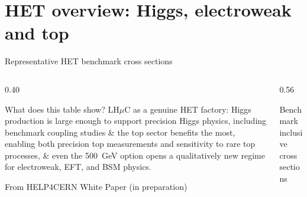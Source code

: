 \documentclass[aspectratio=1610,english]{beamer}
\begin{document}
\section{HET overview: Higgs, electroweak and top}



\begin{frame}{Representative HET benchmark cross sections}
\begin{columns}%
		
\begin{column}{0.40\textwidth}	
\begin{block}{What does this table show?}
\small
\justifying LH$\mu$C as a genuine HET factory:
Higgs production is large enough to support precision Higgs physics, including benchmark coupling studies {\color{red}\&} 
the top sector benefits the most, enabling both precision top measurements and sensitivity to rare top processes, {\color{red}\&}  
even the 500~GeV option opens a qualitatively new regime for electroweak, EFT, and BSM physics.
\end{block}
\centering
\tiny
{\setlength{\fboxsep}{4pt}\colorbox{yellow!40}{\strut From HELP4CERN White Paper (in preparation)}}
\end{column}



\begin{column}{0.56\textwidth}
			
{
				
\begin{block}{Benchmark inclusive cross sections}
\centering
\renewcommand{\arraystretch}{1.2}
\end{block}}
\end{column}
\end{columns}
\end{frame}
\end{document}
